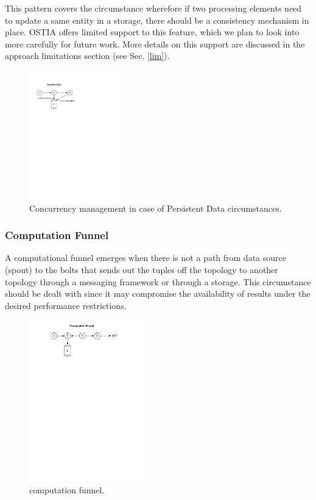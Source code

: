 This pattern covers the circumstance wherefore if two processing elements need to update a same entity in a storage, there should be a consistency mechanism in place. OSTIA offers limited support to this feature, which we plan to look into more carefully for future work. More details on this support are discussed in the approach limitations section (see Sec. \ref{lim}).

\begin{figure}[H]
	\begin{center}
		\includegraphics[width=4cm]{images/persistence}
		\caption{Concurrency management in case of Persistent Data circumstances.}
		\label{fig:persistence}
	\end{center}
\end{figure}


\subsubsection{Computation Funnel}
A computational funnel emerges when there is not a path from data source (spout) to the bolts that sends out the tuples off the topology to another topology through a messaging framework or through a storage. This circumstance should be dealt with since it may compromise the availability of results under the desired performance restrictions.

\begin{figure}[H]
	\begin{center}
		\includegraphics[width=5cm]{images/funnel}
		\caption{computation funnel.}
		\label{fig:funnel}
	\end{center}
\end{figure}

